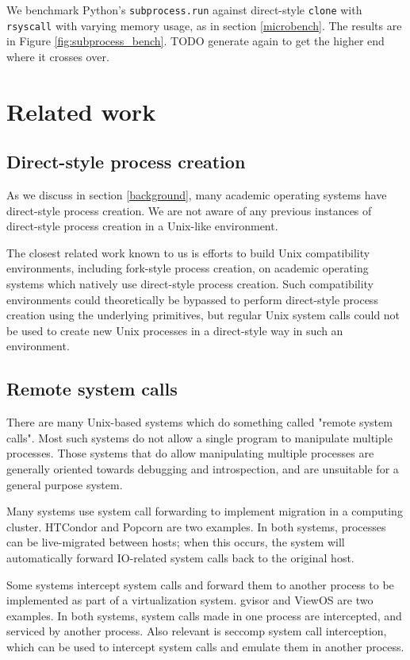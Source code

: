 \documentclass[sigplan]{acmart}
\begin{document}
We benchmark Python's \texttt{subprocess.run} against direct-style \texttt{clone} with \texttt{rsyscall}
with varying memory usage, as in section \ref{microbench}.
The results are in Figure \ref{fig:subprocess_bench}.
TODO generate again to get the higher end where it crosses over.
\section{Related work}\label{related_work}
\subsection{Direct-style process creation}
As we discuss in section \ref{background},
many academic operating systems have direct-style process creation.
We are not aware of any previous instances of direct-style process creation in a Unix-like environment.

The closest related work known to us
is efforts to build Unix compatibility environments, including fork-style process creation,
on academic operating systems which natively use direct-style process creation.\cite{exokernel}
Such compatibility environments could theoretically be bypassed to perform direct-style process creation
using the underlying primitives,
but regular Unix system calls could not be used to create new Unix processes in a direct-style way
in such an environment.
\subsection{Remote system calls}
There are many Unix-based systems which do something called "remote system calls".
Most such systems do not allow a single program to manipulate multiple processes.
Those systems that do allow manipulating multiple processes
are generally oriented towards debugging and introspection,
and are unsuitable for a general purpose system.

Many systems use system call forwarding to implement migration in a computing cluster.
HTCondor\cite{condor} and Popcorn\cite{popcorn} are two examples.
In both systems, processes can be live-migrated between hosts;
when this occurs, the system will automatically forward IO-related system calls
back to the original host.

Some systems intercept system calls and forward them to another process to be implemented
as part of a virtualization system.
gvisor\cite{gvisor} and ViewOS\cite{viewos} are two examples.
In both systems,
system calls made in one process are intercepted,
and serviced by another process.
Also relevant is seccomp system call interception,
which can be used to intercept system calls and emulate them in another process.
\end{document}
